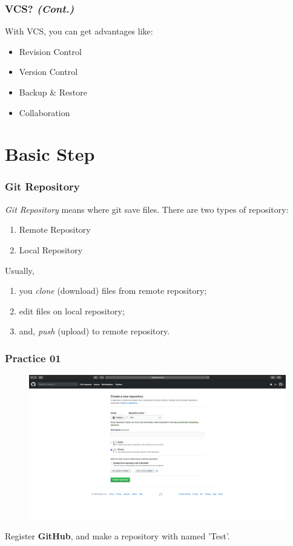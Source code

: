 \documentclass[aspectratio=169]{beamer}
\begin{document}
	\begin{frame}
		\frametitle{VCS? \textit{(Cont.)}}
		
		With VCS, you can get advantages like:
		\begin{itemize}
			\item Revision Control
			\item Version Control
			\item Backup \& Restore
			\item Collaboration
		\end{itemize}
	\end{frame}

	\section{Basic Step}
	\begin{frame}
		\frametitle{Git Repository}
		
		\textit{Git Repository} means where git save files. There are two types of repository:
		\begin{enumerate}
			\item Remote Repository
			\item Local Repository
		\end{enumerate}
	
		Usually, 
		\begin{enumerate}
			\item you \textit{clone} (download) files from remote repository;
			\item edit files on local repository;
			\item and, \textit{push} (upload) to remote repository.
		\end{enumerate}
	\end{frame}

	\begin{frame}
		\frametitle{Practice 01}
		
		\begin{figure}
			\centering
			\includegraphics[width=0.6 \linewidth]{figures/1.png}
		\end{figure}
	
		Register \textbf{GitHub}, and make a repository with named 'Test'.
	\end{frame}
\end{document}
